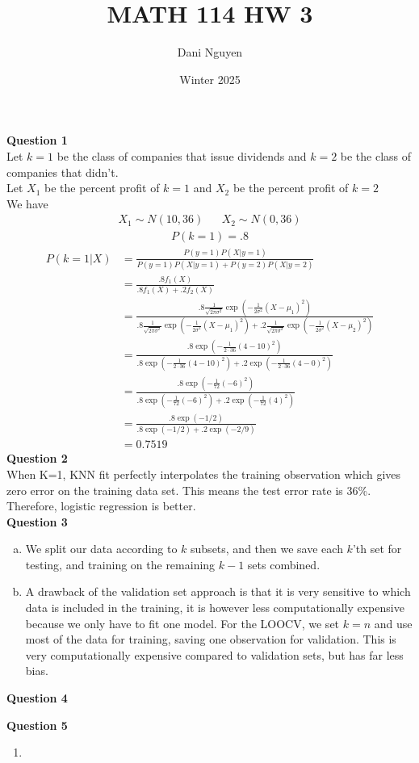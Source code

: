 \documentclass[12pt, letterpaper]{article}
\title{MATH 114 HW 3}
\author{Dani Nguyen}
\date{Winter 2025}
\begin{document}
\maketitle
\graphicspath{ {./} }

\noindent \textbf{Question 1} \\
Let $k = 1$ be the class of companies that issue dividends and $k=2$ be the class 
of companies that didn't. \\
Let $X_1$ be the percent profit of $k=1$ and $X_2$ be the percent profit of $k=2$ \\
We have
\begin{align*}
    X_1 \sim N(10,36) && X_2 \sim N(0,36)
\end{align*}
\begin{align*}
    P(k=1) = .8
\end{align*}
\begin{align*}
    P(k=1 | X) &= \frac{P( y = 1 ) P(X | y = 1)}{P( y = 1 ) P(X | y = 1) + P( y = 2 ) P(X | y = 2)} \\
    &= \frac{.8 f_1(X)}{.8 f_1(X) + .2 f_2(X)} \\
    &= \frac{.8 \frac{1}{\sqrt{2\pi\sigma^2}} \exp (-\frac{1}{2\sigma^2}(X-\mu_1)^2)}{.8 \frac{1}{\sqrt{2\pi\sigma^2}} \exp (-\frac{1}{2\sigma^2}(X-\mu_1)^2) + .2 \frac{1}{\sqrt{2\pi\sigma^2}} \exp (-\frac{1}{2\sigma^2}(X-\mu_2)^2)} \\
    &= \frac{.8 \exp (-\frac{1}{2\cdot 36}(4-10)^2)}{.8 \exp (-\frac{1}{2\cdot 36}(4-10)^2) + .2 \exp (-\frac{1}{2\cdot 36}(4-0)^2)} \\
    &= \frac{.8 \exp (-\frac{1}{72}(-6)^2)}{.8 \exp (-\frac{1}{72}(-6)^2) + .2 \exp (-\frac{1}{72}(4)^2)} \\
    &= \frac{.8 \exp (-1/2)}{.8 \exp (-1/2) + .2 \exp (-2/9)} \\
    &= 0.7519
\end{align*}
\noindent \textbf{Question 2} \\
When K=1, KNN fit perfectly interpolates the training observation which gives 
zero error on the training data set. This means the test error rate is 36\%. 
Therefore, logistic regression is better. \\

\noindent \textbf{Question 3} 
\begin{enumerate}[a.]
    \item We split our data according to $k$ subsets, and then we save each 
    $k$'th set for testing, and training on the remaining $k-1$ sets combined.
    \item A drawback of the validation set approach is that it is very sensitive 
    to which data is included in the training, it is however less computationally 
    expensive because we only have to fit one model. For the LOOCV, we set $k=n$
    and use most of the data for training, saving one observation for validation.
    This is very computationally expensive compared to validation sets, but has
    far less bias.
\end{enumerate}

\noindent \textbf{Question 4} 

\noindent \textbf{Question 5} 
\begin{enumerate}
    \item 
\end{enumerate}
\end{document}
